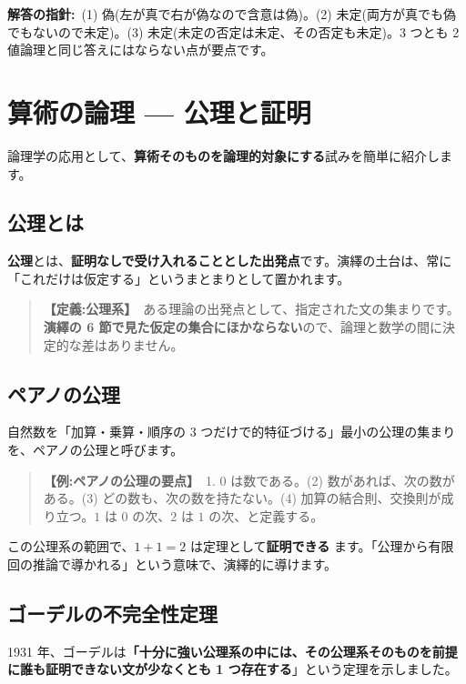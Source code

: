 \documentclass{article}
\begin{document}
\textbf{解答の指針:}\ (1) 偽(左が真で右が偽なので含意は偽)。(2) 未定(両方が真でも偽でもないので未定)。(3) 未定(未定の否定は未定、その否定も未定)。3 つとも 2 値論理と同じ答えにはならない点が要点です。

\section{算術の論理 — 公理と証明}

論理学の応用として、\textbf{算術そのものを論理的対象にする}試みを簡単に紹介します。

\subsection{公理とは}

\textbf{公理}とは、\textbf{証明なしで受け入れることとした出発点}です。演繹の土台は、常に「これだけは仮定する」というまとまりとして置かれます。

\begin{quote}
\textbf{【定義:公理系】}\ ある理論の出発点として、指定された文の集まりです。\textbf{演繹の 6 節で見た仮定の集合にほかならない}ので、論理と数学の間に決定的な差はありません。
\end{quote}

\subsection{ペアノの公理}

自然数を「加算・乗算・順序の 3 つだけで的特征づける」最小の公理の集まりを、ペアノの公理と呼びます。

\begin{quote}
\textbf{【例:ペアノの公理の要点】}\ 1. \(0\) は数である。(2) 数があれば、次の数がある。(3) どの数も、次の数を持たない。(4) 加算の結合則、交換則が成り立つ。\(1\) は \(0\) の次、\(2\) は \(1\) の次、と定義する。
\end{quote}

この公理系の範囲で、\(1 + 1 = 2\) は定理として\textbf{証明できる} ます。「公理から有限回の推論で導かれる」という意味で、演繹的に導けます。

\subsection{ゴーデルの不完全性定理}

1931 年、ゴーデルは\textbf{「十分に強い公理系の中には、その公理系そのものを前提に誰も証明できない文が少なくとも 1 つ存在する}」という定理を示しました。
\end{document}
